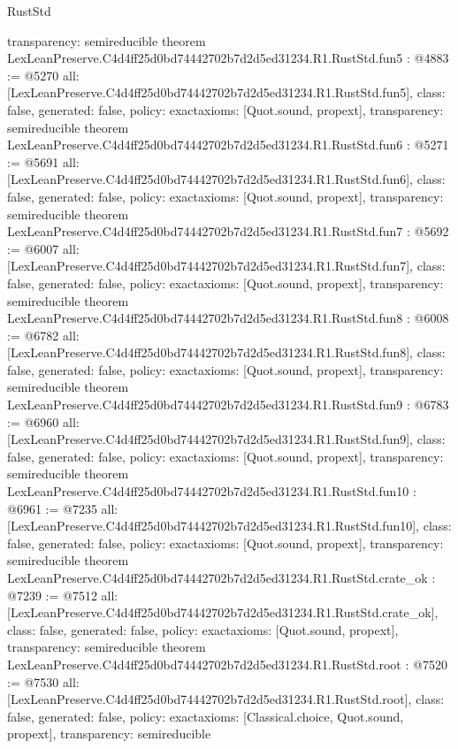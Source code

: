 \begin{lexlean}{RustStd}
\begin{coremodule}
{  transparency: semireducible
}
theorem LexLeanPreserve.C4d4ff25d0bd74442702b7d2d5ed31234.R1.RustStd.fun5 : @4883 := @5270 {
  all: [LexLeanPreserve.C4d4ff25d0bd74442702b7d2d5ed31234.R1.RustStd.fun5],
  class: false,
  generated: false,
  policy: exact{axioms: [Quot.sound, propext]},
  transparency: semireducible
}
theorem LexLeanPreserve.C4d4ff25d0bd74442702b7d2d5ed31234.R1.RustStd.fun6 : @5271 := @5691 {
  all: [LexLeanPreserve.C4d4ff25d0bd74442702b7d2d5ed31234.R1.RustStd.fun6],
  class: false,
  generated: false,
  policy: exact{axioms: [Quot.sound, propext]},
  transparency: semireducible
}
theorem LexLeanPreserve.C4d4ff25d0bd74442702b7d2d5ed31234.R1.RustStd.fun7 : @5692 := @6007 {
  all: [LexLeanPreserve.C4d4ff25d0bd74442702b7d2d5ed31234.R1.RustStd.fun7],
  class: false,
  generated: false,
  policy: exact{axioms: [Quot.sound, propext]},
  transparency: semireducible
}
theorem LexLeanPreserve.C4d4ff25d0bd74442702b7d2d5ed31234.R1.RustStd.fun8 : @6008 := @6782 {
  all: [LexLeanPreserve.C4d4ff25d0bd74442702b7d2d5ed31234.R1.RustStd.fun8],
  class: false,
  generated: false,
  policy: exact{axioms: [Quot.sound, propext]},
  transparency: semireducible
}
theorem LexLeanPreserve.C4d4ff25d0bd74442702b7d2d5ed31234.R1.RustStd.fun9 : @6783 := @6960 {
  all: [LexLeanPreserve.C4d4ff25d0bd74442702b7d2d5ed31234.R1.RustStd.fun9],
  class: false,
  generated: false,
  policy: exact{axioms: [Quot.sound, propext]},
  transparency: semireducible
}
theorem LexLeanPreserve.C4d4ff25d0bd74442702b7d2d5ed31234.R1.RustStd.fun10 : @6961 := @7235 {
  all: [LexLeanPreserve.C4d4ff25d0bd74442702b7d2d5ed31234.R1.RustStd.fun10],
  class: false,
  generated: false,
  policy: exact{axioms: [Quot.sound, propext]},
  transparency: semireducible
}
theorem LexLeanPreserve.C4d4ff25d0bd74442702b7d2d5ed31234.R1.RustStd.crate_ok : @7239 := @7512 {
  all: [LexLeanPreserve.C4d4ff25d0bd74442702b7d2d5ed31234.R1.RustStd.crate_ok],
  class: false,
  generated: false,
  policy: exact{axioms: [Quot.sound, propext]},
  transparency: semireducible
}
theorem LexLeanPreserve.C4d4ff25d0bd74442702b7d2d5ed31234.R1.RustStd.root : @7520 := @7530 {
  all: [LexLeanPreserve.C4d4ff25d0bd74442702b7d2d5ed31234.R1.RustStd.root],
  class: false,
  generated: false,
  policy: exact{axioms: [Classical.choice, Quot.sound, propext]},
  transparency: semireducible
}


\end{coremodule}
\end{lexlean}

